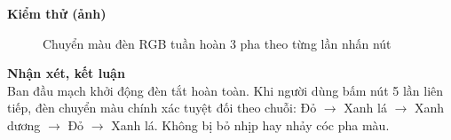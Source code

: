 \noindent\textbf{Kiểm thử (ảnh)}\\
\begin{figure}[H]
    \centering
    \caption{Chuyển màu đèn RGB tuần hoàn 3 pha theo từng lần nhấn nút}
    \label{fig:bt20}
\end{figure}

\noindent\textbf{Nhận xét, kết luận}\\
Ban đầu mạch khởi động đèn tắt hoàn toàn. Khi người dùng bấm nút 5 lần liên tiếp, đèn chuyển màu chính xác tuyệt đối theo chuỗi: Đỏ $\to$ Xanh lá $\to$ Xanh dương $\to$ Đỏ $\to$ Xanh lá. Không bị bỏ nhịp hay nhảy cóc pha màu.
